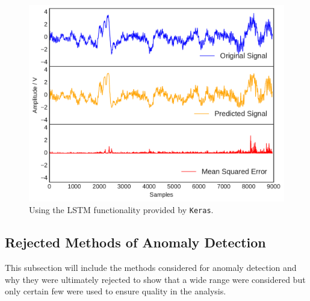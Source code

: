 
\begin{figure}[t]
    \includegraphics[width=1.0\textwidth]{fig/neuralnetwork.pdf}
    \caption[Neural Network]{Using the LSTM functionality provided by \texttt{Keras}.}
    \label{fig:kmeanerror}
\end{figure}


\subsection{Rejected Methods of Anomaly Detection}
This subsection will include the methods considered for anomaly detection and why they were ultimately rejected to show that a wide range were considered but only certain few were used to ensure quality in the analysis.
